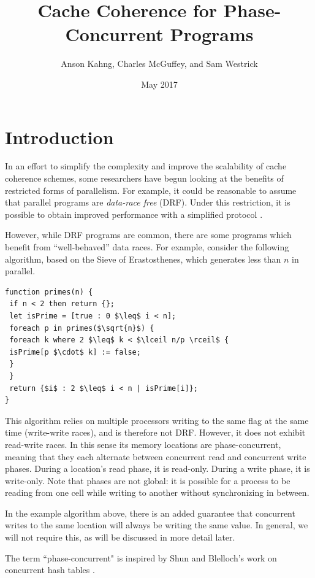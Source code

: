 \documentclass{article}
\title{Cache Coherence for Phase-Concurrent Programs}
\author{Anson Kahng, Charles McGuffey, and Sam Westrick}
\date{May 2017}
\begin{document}
\newcommand{\todo}[1]{{\color{red} \textbf{TODO}: {#1}}}

\maketitle

\section{Introduction}

In an effort to simplify the complexity and improve the scalability of cache coherence schemes, some researchers have begun looking at the benefits of restricted forms of parallelism. For example, it could be reasonable to assume that parallel programs are \textit{data-race free} (DRF). Under this restriction, it is possible to obtain improved performance with a simplified protocol \cite{choi2010denovo} \cite{ros2012complexity}.

However, while DRF programs are common, there are some programs which benefit from ``well-behaved'' data races. For example, consider the following algorithm, based on the Sieve of Erastosthenes, which generates less than $n$ in parallel.

\begin{lstlisting}
function primes(n) {
 if n < 2 then return {};
 let isPrime = [true : 0 $\leq$ i < n];
 foreach p in primes($\sqrt{n}$) {
 foreach k where 2 $\leq$ k < $\lceil n/p \rceil$ {
 isPrime[p $\cdot$ k] := false;
 }
 }
 return {$i$ : 2 $\leq$ i < n | isPrime[i]};
}
\end{lstlisting}

This algorithm relies on multiple processors writing to the same flag at the same time (write-write races), and is therefore not DRF. However, it does not exhibit read-write races. In this sense its memory locations are phase-concurrent, meaning that they each alternate between concurrent read and concurrent write phases. During a location's read phase, it is read-only. During a write phase, it is write-only. Note that phases are not global: it is possible for a process to be reading from one cell while writing to another without synchronizing in between.

In the example algorithm above, there is an added guarantee that concurrent writes to the same location will always be writing the same value. In general, we will not require this, as will be discussed in more detail later.

The term ``phase-concurrent" is inspired by Shun and Blelloch's work on concurrent hash tables \cite{shun2014phase}.
\end{document}
